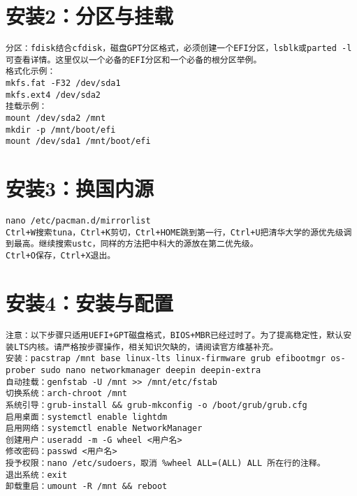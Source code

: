 \documentclass[a4paper,fontset=fandol,zihao=-4,linespread=1.2,oneside]{ctexbook}
\begin{document}
\section{安装2：分区与挂载}
\begin{lstlisting}
分区：fdisk结合cfdisk，磁盘GPT分区格式，必须创建一个EFI分区，lsblk或parted -l可查看详情。这里仅以一个必备的EFI分区和一个必备的根分区举例。
格式化示例：
mkfs.fat -F32 /dev/sda1
mkfs.ext4 /dev/sda2
挂载示例：
mount /dev/sda2 /mnt
mkdir -p /mnt/boot/efi
mount /dev/sda1 /mnt/boot/efi
\end{lstlisting}

\section{安装3：换国内源}
\begin{lstlisting}
nano /etc/pacman.d/mirrorlist
Ctrl+W搜索tuna，Ctrl+K剪切，Ctrl+HOME跳到第一行，Ctrl+U把清华大学的源优先级调到最高。继续搜索ustc，同样的方法把中科大的源放在第二优先级。
Ctrl+O保存，Ctrl+X退出。
\end{lstlisting}

\section{安装4：安装与配置}
\begin{lstlisting}
注意：以下步骤只适用UEFI+GPT磁盘格式，BIOS+MBR已经过时了。为了提高稳定性，默认安装LTS内核。请严格按步骤操作，相关知识欠缺的，请阅读官方维基补充。
安装：pacstrap /mnt base linux-lts linux-firmware grub efibootmgr os-prober sudo nano networkmanager deepin deepin-extra
自动挂载：genfstab -U /mnt >> /mnt/etc/fstab
切换系统：arch-chroot /mnt
系统引导：grub-install && grub-mkconfig -o /boot/grub/grub.cfg
启用桌面：systemctl enable lightdm
启用网络：systemctl enable NetworkManager
创建用户：useradd -m -G wheel <用户名>
修改密码：passwd <用户名>
授予权限：nano /etc/sudoers，取消 %wheel ALL=(ALL) ALL 所在行的注释。
退出系统：exit
卸载重启：umount -R /mnt && reboot
\end{lstlisting}
\end{document}
